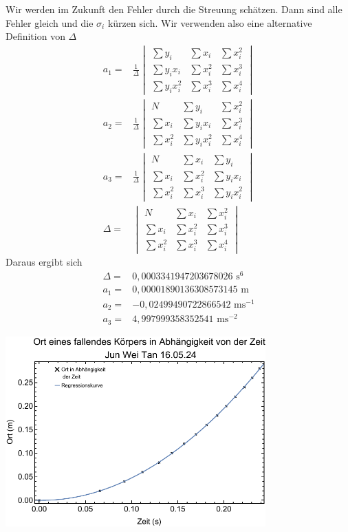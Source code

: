 \documentclass[prb,12pt]{revtex4-2}
\theoremstyle{definition}
\theoremstyle{definition}
\begin{document}
Wir werden im Zukunft den Fehler durch die Streuung schätzen. Dann sind alle Fehler gleich und die $\sigma_i$ kürzen sich. Wir verwenden also eine alternative Definition von $\Delta$
\begin{align*}
	a_1=&\frac 1\Delta \begin{vmatrix}
		\sum y_i & \sum x_i & \sum x_i^2 \\ \sum y_i x_i & \sum x_i^2 & \sum x_i^3 \\
		\sum y_i x_i^2 & \sum x_i^3 & \sum x_i^4
	\end{vmatrix}\\
	a_2=&\frac 1\Delta \begin{vmatrix}
		N & \sum y_i & \sum x_i^2 \\ \sum x_i & \sum y_i x_i & \sum x_i^3 \\
		\sum x_i^2 & \sum y_i x_i^2 & \sum x_i^4
	\end{vmatrix}\\
	a_3=& \frac 1\Delta \begin{vmatrix}
		N & \sum x_i & \sum y_i \\
		\sum x_i & \sum x_i^2 & \sum y_i x_i \\
		\sum x_i^2 & \sum x_i^3 & \sum y_i x_i^2
	\end{vmatrix}\\
	\Delta=&\begin{vmatrix}
		N & \sum x_i & \sum x_i^2 \\ \sum x_i & \sum x_i^2 & \sum x_i^3 \\
		\sum x_i^2 & \sum x_i^3 & \sum x_i^4
	\end{vmatrix}
\end{align*}
Daraus ergibt sich
\begin{align*}
	\Delta=&0,0003341947203678026\text{ s}^{6}\\
	a_1=&0,00001890136308573145\text{ m}\\
	a_2=&-0,02499490722866542\text{ ms}^{-1}\\
	a_3=&4,997999358352541\text{ ms}^{-2}
\end{align*}

\begin{center}
\includegraphics[width=0.75\textwidth]{plt.pdf}
\end{center}
\end{document}
